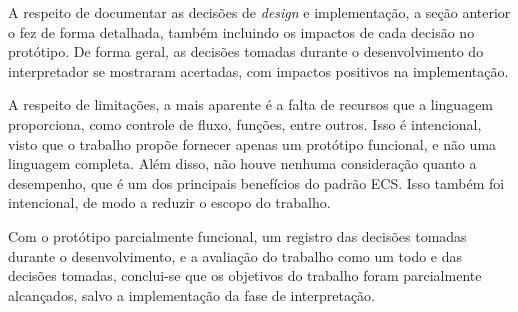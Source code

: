 A respeito de documentar as decisões de \textit{design} e implementação, a seção anterior o fez de forma detalhada, também incluindo os impactos de cada decisão no protótipo. De forma geral, as decisões tomadas durante o desenvolvimento do interpretador se mostraram acertadas, com impactos positivos na implementação.

A respeito de limitações, a mais aparente é a falta de recursos que a linguagem proporciona, como controle de fluxo, funções, entre outros. Isso é intencional, visto que o trabalho propõe fornecer apenas um protótipo funcional, e não uma linguagem completa. Além disso, não houve nenhuma consideração quanto a desempenho, que é um dos principais benefícios do padrão ECS. Isso também foi intencional, de modo a reduzir o escopo do trabalho.

Com o protótipo parcialmente funcional, um registro das decisões tomadas durante o desenvolvimento, e a avaliação do trabalho como um todo e das decisões tomadas, conclui-se que os objetivos do trabalho foram parcialmente alcançados, salvo a implementação da fase de interpretação.
